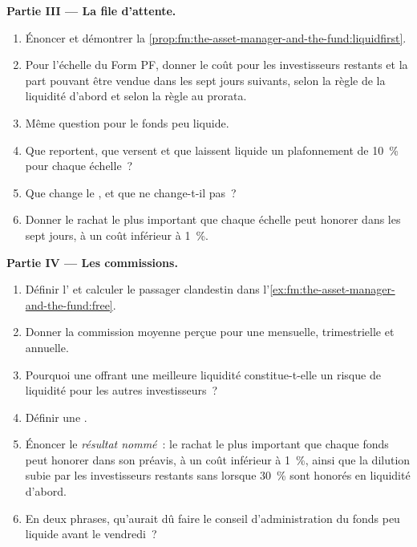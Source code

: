 \begin{problem}
\medskip\noindent\textbf{Partie III --- La file d'attente.}
\begin{enumerate}[resume]
\item Énoncer et démontrer la \cref{prop:fm:the-asset-manager-and-the-fund:liquidfirst}.
\item Pour l'échelle du Form PF, donner le coût pour les investisseurs restants et la part pouvant être vendue dans les sept jours suivants, selon la règle de la liquidité d'abord et selon la règle au prorata.
\item Même question pour le fonds peu liquide.
\item Que reportent, que versent et que laissent liquide un plafonnement de 10~\% pour chaque échelle~?
\item Que change le , et que ne change-t-il pas~?
\item Donner le rachat le plus important que chaque échelle peut honorer dans les sept jours, à un coût inférieur à 1~\%.
\end{enumerate}

\medskip\noindent\textbf{Partie IV --- Les commissions.}
\begin{enumerate}[resume]
\item Définir l' et calculer le passager clandestin dans l'\cref{ex:fm:the-asset-manager-and-the-fund:free}.
\item Donner la commission moyenne perçue pour une  mensuelle, trimestrielle et annuelle.
\item Pourquoi une  offrant une meilleure liquidité constitue-t-elle un risque de liquidité pour les autres investisseurs~?
\item Définir une .
\item Énoncer le \emph{résultat nommé}~: le rachat le plus important que chaque fonds peut honorer dans son préavis, à un coût inférieur à 1~\%, ainsi que
la dilution subie par les investisseurs restants sans  lorsque 30~\% sont honorés en liquidité d'abord.
\item En deux phrases, qu'aurait dû faire le conseil d'administration du fonds peu liquide avant le vendredi~?
\end{enumerate}
\end{problem}

